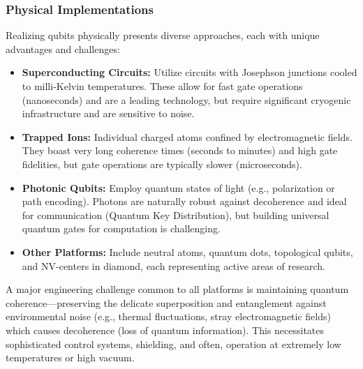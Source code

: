 \subsubsection*{Physical Implementations}
Realizing qubits physically presents diverse approaches, each with unique advantages and challenges:
\begin{itemize}
    \item \textbf{Superconducting Circuits:} Utilize circuits with Josephson junctions cooled to milli-Kelvin temperatures. These allow for fast gate operations (nanoseconds) and are a leading technology, but require significant cryogenic infrastructure and are sensitive to noise.
    \item \textbf{Trapped Ions:} Individual charged atoms confined by electromagnetic fields. They boast very long coherence times (seconds to minutes) and high gate fidelities, but gate operations are typically slower (microseconds).
    \item \textbf{Photonic Qubits:} Employ quantum states of light (e.g., polarization or path encoding). Photons are naturally robust against decoherence and ideal for communication (Quantum Key Distribution), but building universal quantum gates for computation is challenging.
    \item \textbf{Other Platforms:} Include neutral atoms, quantum dots, topological qubits, and NV-centers in diamond, each representing active areas of research.
\end{itemize}
A major engineering challenge common to all platforms is maintaining quantum coherence—preserving the delicate superposition and entanglement against environmental noise (e.g., thermal fluctuations, stray electromagnetic fields) which causes decoherence (loss of quantum information). This necessitates sophisticated control systems, shielding, and often, operation at extremely low temperatures or high vacuum.

